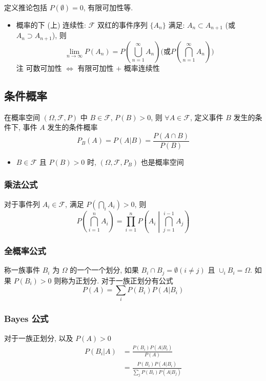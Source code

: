 \documentclass[11pt,a4paper,twocolumn]{article} %
\numberwithin{equation}{section} %
\begin{document}
定义推论包括 $P(\emptyset) = 0$, 有限可加性等.
\begin{itemize}
	\item 概率的下 (上) 连续性: $\mathscr F$ 双红的事件序列 $\{A_n\}$ 满足: 
	$A_n\subset A_{n+1}$ (或 $A_n\supset A_{n+1}$), 则
	\begin{equation}
		\lim_{n\to\infty} P(A_n) = P\left(\bigcup_{n=1}^\infty A_n\right)
		\mbox{(或}P\left(\bigcap_{n=1}^\infty A_n\right)\mbox{)}
	\end{equation}
	注 可数可加性 $\Leftrightarrow$ 有限可加性 $+$ 概率连续性
\end{itemize}
\subsection{条件概率} %
\label{sub:bayes}
在概率空间 $(\Omega, \mathscr F, P)$ 中 $B\in\mathscr F$, $P(B) > 0$, 
则 $\forall A\in\mathscr F$, 
定义事件 $B$ 发生的条件下, 事件 $A$ 发生的条件概率
\begin{equation}
	P_B(A) = P(A|B) = \frac{P(A\cap B)}{P(B)}
\end{equation}
\begin{itemize}
	\item $B\in\mathscr F$ 且 $P(B) > 0$ 时, $(\Omega, \mathscr F, P_B)$
	也是概率空间
\end{itemize}
\subsubsection{乘法公式} %
\label{ssub:prod_equ}
对于事件列 $A_i\in\mathscr F$, 满足 $P(\bigcap_i A_i)>0$, 则
\begin{equation}
	P\left(\bigcap_{i=1}^n A_i\right) = \prod_{i=1}^n
	P\left(A_i\middle|\bigcap_{j=1}^{i-1}A_j\right)
\end{equation}
\subsubsection{全概率公式} %
\label{ssub:full_prob_equ}
称一族事件 $B_i$ 为 $\Omega$ 的一个一个划分, 
如果 $B_i\cap B_j = \emptyset (i\neq j)$ 且 $\cup_i B_i = \Omega$. 
如果 $P(B_i) >0$ 则称为正划分. 对于一族正划分有公式
\begin{equation}
	P(A) = \sum_i P(B_i)P(A|B_i)
\end{equation}
\subsubsection{Bayes 公式} %
\label{ssub:bayes}
对于一族正划分, 以及 $P(A) > 0$
\begin{align}
	P(B_i|A) &= \frac{P(B_i)P(A|B_i)}{P(A)}\\
	&= \frac{P(B_i)P(A|B_i)}{\sum_j P(B_i)P(A|B_j)}
\end{align}
\end{document}
